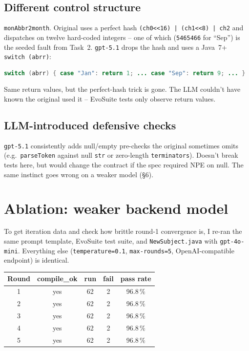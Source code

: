 \documentclass[manuscript,review,nonacm]{acmart}
\begin{document}
\subsection{Different control structure}
\texttt{monAbbr2month}. Original uses a perfect hash
\texttt{(ch0<<16) | (ch1<<8) | ch2} and dispatches on twelve
hard-coded integers -- one of which (\texttt{5465466} for ``Sep'')
is the seeded fault from Task~2. \texttt{gpt-5.1} drops the hash and
uses a Java~7+ \texttt{switch (abrr)}:

\begin{lstlisting}[language=Java]
switch (abrr) { case "Jan": return 1; ... case "Sep": return 9; ... }
\end{lstlisting}

Same return values, but the perfect-hash trick is gone. The LLM
couldn't have known the original used it -- EvoSuite tests only
observe return values.

\subsection{LLM-introduced defensive checks}
\texttt{gpt-5.1} consistently adds null/empty pre-checks the original
sometimes omits (e.g.\ \texttt{parseToken} against null \texttt{str}
or zero-length \texttt{terminators}). Doesn't break tests here, but
would change the contract if the spec required NPE on null. The same
instinct goes wrong on a weaker model (\S6).

\section{Ablation: weaker backend model}

To get iteration data and check how brittle round-1 convergence is, I
re-ran the same prompt template, EvoSuite test suite, and
\texttt{NewSubject.java} with \texttt{gpt-4o-mini}. Everything else
(\texttt{temperature=0.1}, \texttt{max-rounds=5}, OpenAI-compatible
endpoint) is identical.

\begin{tabular}{ccccc}
\toprule
Round & compile\_ok & run & fail & pass rate \\
\midrule
1 & yes & 62 & 2 & 96.8\,\% \\
2 & yes & 62 & 2 & 96.8\,\% \\
3 & yes & 62 & 2 & 96.8\,\% \\
4 & yes & 62 & 2 & 96.8\,\% \\
5 & yes & 62 & 2 & 96.8\,\% \\
\bottomrule
\end{tabular}
\end{document}
